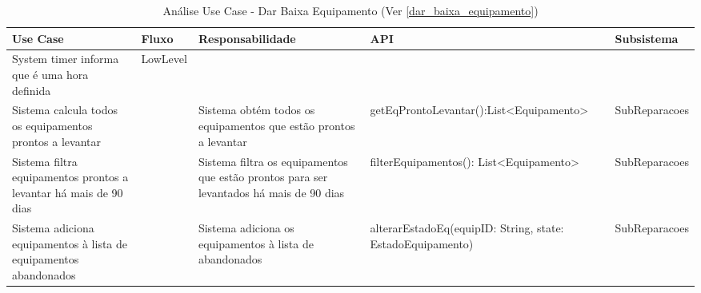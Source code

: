 \documentclass[../relatorio.tex]{subfiles}
\begin{document}
\begin{landscape}
    \begin{table}[!h]
        \centering
        \begin{tabular}{|p{5cm}|p{1cm}|p{4cm}|p{6cm}|p{3cm}|}
            \hline
            \rowcolor{gray!20!white}
            Use Case & Fluxo & Responsabilidade & API & Subsistema \\
            \hline
            \rowcolor{red}
            System timer informa que é uma hora definida
                     & LowLevel
                     &
                     &
                     &
            \\
            \hline
            Sistema calcula todos os equipamentos prontos a levantar 
                     & 
                     & Sistema obtém todos os equipamentos que estão prontos a levantar
                     & getEqProntoLevantar():List<Equipamento>
                     & SubReparacoes
            \\
            \hline
            Sistema filtra equipamentos prontos a levantar há mais de 90 dias
                     &
                     & Sistema filtra os equipamentos que estão prontos para ser levantados há mais de 90 dias
                     & filterEquipamentos(): List<Equipamento>
                     & SubReparacoes
            \\
            \hline
            Sistema adiciona equipamentos à lista de equipamentos abandonados
                     & 
                     & Sistema adiciona os equipamentos à lista de abandonados
                     & alterarEstadoEq(equipID: String, state: EstadoEquipamento)
                     & SubReparacoes
            \\
            \hline
        \end{tabular}
        \caption{Análise Use Case - Dar Baixa Equipamento (Ver \ref{dar_baixa_equipamento})}
    \end{table}
\end{landscape}
\end{document}
